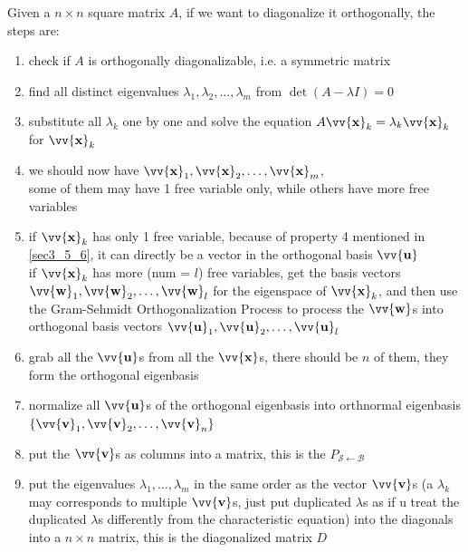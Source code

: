 \documentclass[11pt]{article}
\DeclareRobustCommand{\myvec}[1]{\vv{\mathbf{#1}}}
\newcommand{\myset}[1]{\mathcal{#1}}
\newcommand{\mymat}[1]{#1}
\begin{document}
    Given a $n \times n$ square matrix $\mymat{A}$, if we want to diagonalize it orthogonally, the steps are:
    \begin{enumerate}
        \item check if $\mymat{A}$ is orthogonally diagonalizable, i.e. a symmetric matrix
        \item find all distinct eigenvalues $\lambda_1, \lambda_2, \dots, \lambda_m$ from $\det(\mymat{A} - \lambda\mymat{I}) = 0$
        \item substitute all $\lambda_k$ one by one and solve the equation $\mymat{A}\myvec{x}_k=\lambda_k\myvec{x}_k$ for $\myvec{x}_k$
        \item[-.] we should now have $\myvec{x}_1, \myvec{x}_2, \dots, \myvec{x}_m$, \\
            some of them may have 1 free variable only, while others have more free variables    
        \item if $\myvec{x}_k$ has only 1 free variable, because of property 4 mentioned in \ref{sec3_5_6}, it can directly be a vector in the orthogonal basis $\myvec{u}$\vspace{1ex} \\
            if $\myvec{x}_k$ has more (num = $l$) free variables, get the basis vectors $\myvec{w}_1, \myvec{w}_2, \dots, \myvec{w}_l$ for the eigenspace of $\myvec{x}_k$, 
            and then use the Gram-Sehmidt Orthogonalization Process to process the $\myvec{w}$s into orthogonal basis vectors $\myvec{u}_1, \myvec{u}_2, \dots, \myvec{u}_l$
        \item[-.] grab all the $\myvec{u}$s from all the $\myvec{x}$s, there should be $n$ of them, they form the orthogonal eigenbasis
        \item normalize all $\myvec{u}$s of the orthogonal eigenbasis into orthnormal eigenbasis $\{ \myvec{v}_1, \myvec{v}_2, \dots, \myvec{v}_n \}$
        \item put the $\myvec{v}$s as columns into a matrix, this is the $\mymat{P}_{\myset{S}\leftarrow\myset{B}}$
        \item put the eigenvalues $\lambda_1, \dots, \lambda_m$ in the same order as the vector $\myvec{v}$s (a $\lambda_k$ may corresponds to multiple $\myvec{v}$s, just put duplicated $\lambda$s as if u treat the duplicated $\lambda$s differently from the characteristic equation) into the diagonals into a $n \times n$ matrix, this is the diagonalized matrix $\mymat{D}$
    \end{enumerate}
    

    
\end{document}
